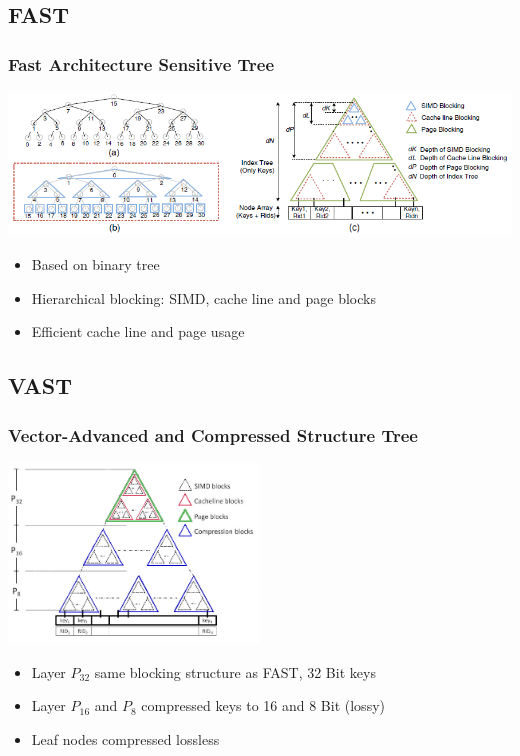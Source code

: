 \documentclass{beamer}
\begin{document}
\subsection{FAST}
\begin{frame}
\frametitle{Fast Architecture Sensitive Tree}
\begin{center}
	\includegraphics[width=1.05\textwidth]{img/fast.png}
\end{center}
\begin{itemize}
	\item Based on binary tree
	\item Hierarchical blocking: SIMD, cache line and page blocks
	\item Efficient cache line and page usage
\end{itemize}
\end{frame}
\subsection{VAST}
\begin{frame}
\frametitle{Vector-Advanced and Compressed Structure Tree}
\begin{center}
	\includegraphics[width=0.5\textwidth]{img/vast2.png}
\end{center}
	\begin{itemize}
	\item Layer $P_{32}$ same blocking structure as FAST, 32 Bit keys
	\item Layer $P_{16}$ and $P_{8}$ compressed keys to 16 and 8 Bit (lossy)
	\item Leaf nodes compressed lossless
\end{itemize}
\end{frame}
\end{document}
